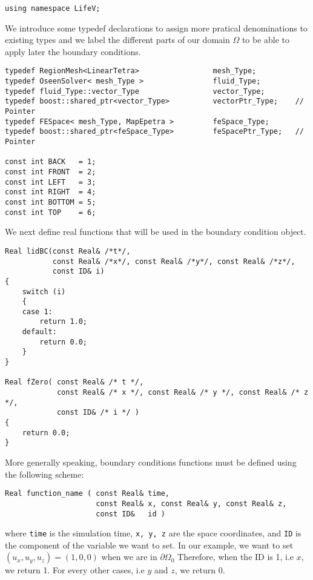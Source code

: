 \begin{verbatim}
using namespace LifeV;
\end{verbatim}

We introduce some typedef declarations to assign more pratical denominations to existing types and we label the different parts of our domain $\Omega$ to be able to apply later the boundary conditions.

\begin{verbatim}
typedef RegionMesh<LinearTetra>                 mesh_Type;
typedef OseenSolver< mesh_Type >                fluid_Type;
typedef fluid_Type::vector_Type                 vector_Type;
typedef boost::shared_ptr<vector_Type>          vectorPtr_Type;    // Pointer
typedef FESpace< mesh_Type, MapEpetra >         feSpace_Type;
typedef boost::shared_ptr<feSpace_Type>         feSpacePtr_Type;   // Pointer

const int BACK   = 1;
const int FRONT  = 2;
const int LEFT   = 3;
const int RIGHT  = 4;
const int BOTTOM = 5;
const int TOP    = 6;
\end{verbatim}



We next define real functions that will be used in the boundary condition
object.


\begin{verbatim}
Real lidBC(const Real& /*t*/,
           const Real& /*x*/, const Real& /*y*/, const Real& /*z*/,
           const ID& i)
{
    switch (i)
    {
    case 1:
        return 1.0;
    default:
        return 0.0;
    }
}

Real fZero( const Real& /* t */,
            const Real& /* x */, const Real& /* y */, const Real& /* z */,
            const ID& /* i */ )
{
    return 0.0;
}
\end{verbatim}

More generally speaking, boundary conditions functions must be defined using the following scheme:

\begin{verbatim}
Real function_name ( const Real& time,
                     const Real& x, const Real& y, const Real& z,
                     const ID&   id )
\end{verbatim}
\noindent where
\verb|time|
is the simulation time,
\verb|x, y, z|
are the space coordinates, and
\verb|ID|
is the component of the variable we want to set.
In our example, we want to set $(u_x, u_y, u_z) = (1, 0, 0)$ when we are in ${\partial \Omega}_0$
Therefore, when the ID is 1, i.e $x$, we return 1. For every other cases, i.e $y$ and $z$,
we return 0.\\

